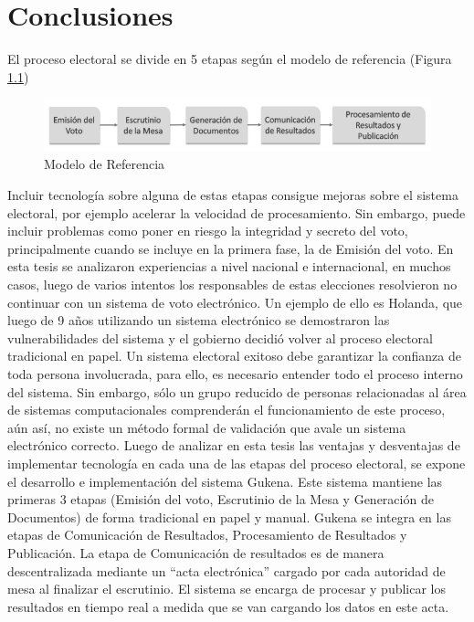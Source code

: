 \label{conclusiones}
\chapter{Conclusiones}
El proceso electoral se divide en 5 etapas según el modelo de referencia \cite{conicet} (Figura \ref{graf:modeloReferencia})
\begin{figure}[h!]
    \begin{center}
        \includegraphics[width=\textwidth]{img/modeloReferencia.png}
    \end{center}
  \caption{Modelo de Referencia}
  \label{graf:modeloReferencia}
\end{figure}
\newline
Incluir tecnología sobre alguna de estas etapas consigue mejoras sobre el sistema electoral, por ejemplo acelerar la velocidad de procesamiento. Sin embargo, puede incluir problemas como  poner en riesgo la integridad y secreto del voto, principalmente cuando se incluye en la primera fase, la de Emisión del voto. En esta tesis se analizaron experiencias a nivel nacional e internacional, en muchos casos, luego de varios intentos los responsables de estas elecciones resolvieron no continuar con un sistema de voto electrónico. Un ejemplo de ello es Holanda, que luego de 9 años utilizando un sistema electrónico se demostraron las vulnerabilidades del sistema y el gobierno decidió volver al proceso electoral tradicional en papel. Un sistema electoral exitoso debe garantizar la confianza de toda persona involucrada, para ello, es necesario entender todo el proceso interno del sistema. Sin embargo, sólo un grupo reducido de personas relacionadas al área de sistemas computacionales comprenderán el funcionamiento de este proceso, aún así, no existe un método formal de validación que avale un sistema electrónico correcto. \newline
Luego de analizar en esta tesis las ventajas y desventajas de implementar tecnología en cada una de las etapas del proceso electoral, se expone el desarrollo e implementación del sistema Gukena. Este sistema mantiene las primeras 3 etapas (Emisión del voto, Escrutinio de la Mesa y Generación de Documentos) de forma tradicional en papel y manual. Gukena se integra en las etapas de Comunicación de Resultados, Procesamiento de Resultados y Publicación. La etapa de Comunicación de resultados es de manera descentralizada mediante un ``acta electrónica'' cargado por cada autoridad de mesa al finalizar el escrutinio. El sistema se encarga de procesar y publicar los resultados en tiempo real a medida que se van cargando los datos en este acta.\newline
